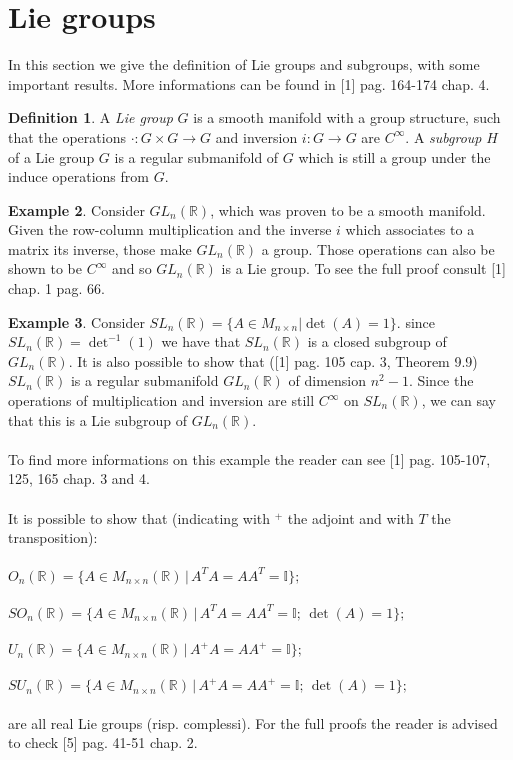 \documentclass[12pt,a4paper]{report}
\theoremstyle{definition}
\newtheorem{Def}{Definition}[chapter]
\theoremstyle{Theorem}
\theoremstyle{definition}
\newtheorem{Ex}[Def]{Example}
\theoremstyle{definition}
\begin{document}
		\section{Lie groups}
		In this section we give the definition of Lie groups and subgroups, with some important results. More informations can be found in [1] pag. 164-174 chap. 4.
		\begin{Def}
			A \textit{Lie group} $G$ is a smooth manifold with a group structure, such that the operations $\cdot:G\times G\rightarrow G$ and inversion $i:G\rightarrow G$ are $C^\infty$.
			A \textit{subgroup} $H$ of a Lie group $G$ is a regular submanifold of $G$ which is still a group under the induce operations from $G$.
		\end{Def}
		\begin{Ex}
			Consider $GL_n(\mathbb{R})$, which was proven to be a smooth manifold. Given the row-column multiplication and the inverse $i$ which associates to a matrix its inverse, those make $GL_n(\mathbb{R})$ a group. Those operations can also be shown to be $C^\infty$ and so $GL_n(\mathbb{R})$ is a Lie group. To see the full proof consult [1] chap. 1 pag. 66.
		\end{Ex}
		\begin{Ex}
			Consider $SL_n(\mathbb{R})=\{A\in M_{n\times n}| \det(A)=1\}$. since $SL_n(\mathbb{R})=\det^{-1}(1)$ we have that $SL_n(\mathbb{R})$ is a closed subgroup of $GL_n(\mathbb{R})$. It is also possible to show that ([1] pag. 105 cap. 3, Theorem 9.9) $SL_n(\mathbb{R})$ is a regular submanifold $GL_n(\mathbb{R})$ of dimension $n^2-1$. Since the operations of multiplication and inversion are still $C^\infty$ on $SL_n(\mathbb{R})$, we can say that this is a Lie subgroup of $GL_n(\mathbb{R})$.\\
			\\
			To find more informations on this example the reader can see [1] pag. 105-107, 125, 165 chap. 3 and 4.\\
			\\
			It is possible to show that (indicating with $^+$ the adjoint and with $T$ the transposition):\\\\
			$O_n(\mathbb{R})=\{A\in M_{n\times n}(\mathbb{R})\, |\, A^TA=AA^T=\mathbb{I}\};$\\\\
			$SO_n(\mathbb{R})=\{A\in M_{n\times n}(\mathbb{R})\, |\, A^TA=AA^T=\mathbb{I};\, \det(A)=1\};$\\\\
			$U_n(\mathbb{R})=\{A\in M_{n\times n}(\mathbb{R})\, |\, A^+A=AA^+=\mathbb{I}\};$\\\\
			$SU_n(\mathbb{R})=\{A\in M_{n\times n}(\mathbb{R})\, |\, A^+A=AA^+=\mathbb{I};\,\det(A)=1\};$\\\\
			are all real Lie groups (risp. complessi). 
			For the full proofs the reader is advised to check [5] pag. 41-51 chap. 2.
		\end{Ex}
\end{document}
